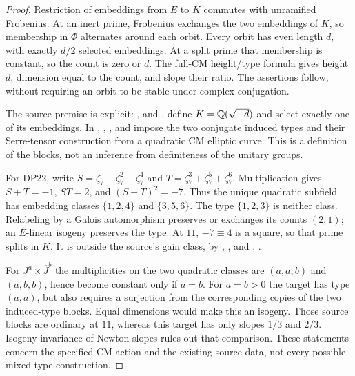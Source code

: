 \documentclass[11pt,a4paper]{article}
\theoremstyle{definition}\newtheorem{remark}[theorem]{Remark}
\begin{document}
\begin{proof}
Restriction of embeddings from $E$ to $K$ commutes with unramified Frobenius. At an inert prime, Frobenius exchanges the two embeddings of $K$, so membership in $\Phi$ alternates around each orbit. Every orbit has even length $d$, with exactly $d/2$ selected embeddings. At a split prime that membership is constant, so the count is zero or $d$. The full-CM height/type formula \cite[\S5, (10*) and Theorem 3]{Tate352} gives height $d$, dimension equal to the count, and slope their ratio. The assertions follow, without requiring an orbit to be stable under complex conjugation.

The source premise is explicit: ,  and , define $K=\mathbb Q(\sqrt{-d})$ and select exactly one of its embeddings. In , , , and  impose the two conjugate induced types and their Serre-tensor construction from a quadratic CM elliptic curve. This is a definition of the blocks, not an inference from definiteness of the unitary groups.

For DP22, write $S=\zeta_7+\zeta_7^2+\zeta_7^4$ and $T=\zeta_7^3+\zeta_7^5+\zeta_7^6$. Multiplication gives $S+T=-1$, $ST=2$, and $(S-T)^2=-7$. Thus the unique quadratic subfield has embedding classes $\{1,2,4\}$ and $\{3,5,6\}$. The type $\{1,2,3\}$ is neither class. Relabeling by a Galois automorphism preserves or exchanges its counts $(2,1)$; an $E$-linear isogeny preserves the type. At $11$, $-7\equiv4$ is a square, so that prime splits in $K$. It is outside the source's  gain class, by , , and , .

For $J^a\times\overline J^{b}$ the multiplicities on the two quadratic classes are $(a,a,b)$ and $(a,b,b)$, hence become constant only if $a=b$. For $a=b>0$ the target has type $(a,a)$, but  also requires a surjection from the corresponding copies of the two induced-type blocks. Equal dimensions would make this an isogeny. Those source blocks are ordinary at $11$, whereas this target has only slopes $1/3$ and $2/3$. Isogeny invariance of Newton slopes rules out that comparison. These statements concern the specified CM action and the existing source data, not every possible mixed-type construction.
\end{proof}
\end{document}
